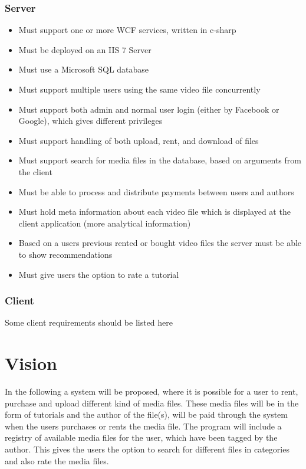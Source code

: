 \subsubsection{Server}
\begin{itemize}
\item Must support one or more WCF services, written in c-sharp
\item Must be deployed on an IIS 7 Server
\item Must use a Microsoft SQL database
\item Must support multiple users using the same video file concurrently
\item Must support both admin and normal user login (either by Facebook or Google), which gives different privileges
\item Must support handling of both upload, rent, and download of files
\item Must support search for media files in the database, based on arguments from the client
\item Must be able to process and distribute payments between users and authors
\item Must hold meta information about each video file which is displayed at the client application (more analytical information)
\item Based on a users previous rented or bought video files the server must be able to show recommendations
\item Must give users the option to rate a tutorial
\end{itemize}

\subsubsection{Client}
Some client requirements should be listed here

\section{Vision}
In the following a system will be proposed, where it is possible for a user to rent, purchase and upload different kind of media files. These media files will be in the form of tutorials and the author of the file(s), will be paid through the system when the users purchases or rents the media file. The program will include a registry of available media files for the user, which have been tagged by the author. This gives the users the option to search for different files in categories and also rate the media files.\\

